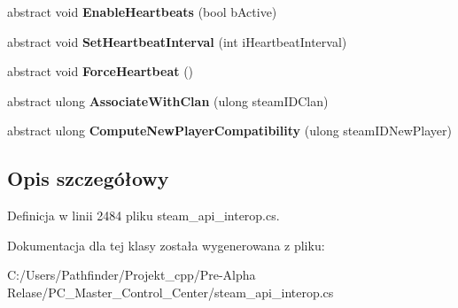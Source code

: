 \begin{DoxyCompactItemize}
abstract void {\bfseries Enable\+Heartbeats} (bool b\+Active)
\item 
\mbox{\label{class_valve_1_1_steamworks_1_1_i_steam_game_server_a0ad8541845fb89200f208cb68a07d934}} 
abstract void {\bfseries Set\+Heartbeat\+Interval} (int i\+Heartbeat\+Interval)
\item 
\mbox{\label{class_valve_1_1_steamworks_1_1_i_steam_game_server_adcade9a8bdbfbf355ea5dce054eab338}} 
abstract void {\bfseries Force\+Heartbeat} ()
\item 
\mbox{\label{class_valve_1_1_steamworks_1_1_i_steam_game_server_ac8e95c89d3f26003ffd940944adb223b}} 
abstract ulong {\bfseries Associate\+With\+Clan} (ulong steam\+I\+D\+Clan)
\item 
\mbox{\label{class_valve_1_1_steamworks_1_1_i_steam_game_server_a608a36b08d96f197aca2076d823e0919}} 
abstract ulong {\bfseries Compute\+New\+Player\+Compatibility} (ulong steam\+I\+D\+New\+Player)
\end{DoxyCompactItemize}


\subsection{Opis szczegółowy}


Definicja w linii 2484 pliku steam\+\_\+api\+\_\+interop.\+cs.



Dokumentacja dla tej klasy została wygenerowana z pliku\+:\begin{DoxyCompactItemize}
\item 
C\+:/\+Users/\+Pathfinder/\+Projekt\+\_\+cpp/\+Pre-\/\+Alpha Relase/\+P\+C\+\_\+\+Master\+\_\+\+Control\+\_\+\+Center/steam\+\_\+api\+\_\+interop.\+cs\end{DoxyCompactItemize}
